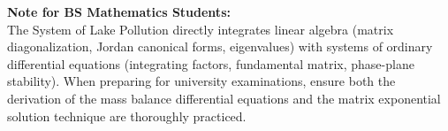 \documentclass[12pt]{article}
\begin{document}
\vspace{14pt}

\begin{tcolorbox}[
  enhanced, arc=4pt, boxrule=1.2pt,
  colback=lightbg, colframe=accent,
  left=14pt, right=14pt, top=10pt, bottom=10pt
]
  \small\color{darktext}
  \textbf{Note for BS Mathematics Students:}\\
  The System of Lake Pollution directly integrates linear algebra (matrix diagonalization, Jordan canonical forms, eigenvalues) with systems of ordinary differential equations (integrating factors, fundamental matrix, phase-plane stability). When preparing for university examinations, ensure both the derivation of the mass balance differential equations and the matrix exponential solution technique are thoroughly practiced.
\end{tcolorbox}
\end{document}
